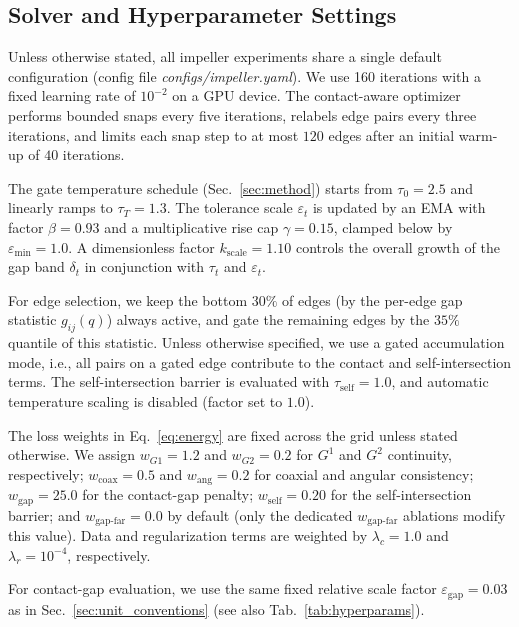 \documentclass{ieeeaccess}
\begin{document}
\subsection{Solver and Hyperparameter Settings}
\label{sec:hyperparams}

Unless otherwise stated, all impeller experiments share a single default
configuration (config file \emph{configs/impeller.yaml}).
We use 160 iterations with a fixed learning rate of $10^{-2}$ on a GPU
device. The contact-aware optimizer performs bounded snaps every
five iterations, relabels edge pairs every three iterations, and limits each
snap step to at most $120$ edges after an initial warm-up of
$40$ iterations.

The gate temperature schedule (Sec.~\ref{sec:method}) starts from
$\tau_0 = 2.5$ and linearly ramps to
$\tau_T = 1.3$. The tolerance scale
$\varepsilon_t$ is updated by an EMA with factor
$\beta = 0.93$ and a multiplicative rise cap
$\gamma = 0.15$, clamped below by
$\varepsilon_{\min} = 1.0$. A dimensionless factor
$k_{\mathrm{scale}} = 1.10$ controls the overall growth of the gap band
$\delta_t$ in conjunction with $\tau_t$ and $\varepsilon_t$.

For edge selection, we keep the bottom $30\%$ of edges (by the per-edge gap statistic
$g_{ij}(q)$) always active, and gate the remaining edges by the $35\%$ quantile of this statistic.
Unless otherwise specified, we use a gated accumulation mode, i.e., all pairs on a gated edge
contribute to the contact and self-intersection terms.
The self-intersection barrier is evaluated with
$\tau_{\mathrm{self}} = 1.0$, and automatic temperature scaling is disabled
(factor set to $1.0$).

The loss weights in Eq.~\eqref{eq:energy} are fixed across the grid unless
stated otherwise. We assign $w_{G1} = 1.2$ and
$w_{G2} = 0.2$ for $G^1$ and $G^2$ continuity, respectively;
$w_{\text{coax}} = 0.5$ and
$w_{\text{ang}} = 0.2$ for coaxial and angular consistency;
$w_{\text{gap}} = 25.0$ for the contact-gap penalty;
$w_{\text{self}} = 0.20$ for the self-intersection
barrier; and $w_{\text{gap-far}} = 0.0$ by default
(only the dedicated $w_{\text{gap-far}}$ ablations modify this value).
Data and regularization terms are weighted by
$\lambda_c = 1.0$ and
$\lambda_r = 10^{-4}$, respectively.

For contact-gap evaluation, we use the same fixed relative scale factor
$\varepsilon_{\mathrm{gap}} = 0.03$ as in Sec.~\ref{sec:unit_conventions}
(see also Tab.~\ref{tab:hyperparams}).
\end{document}
